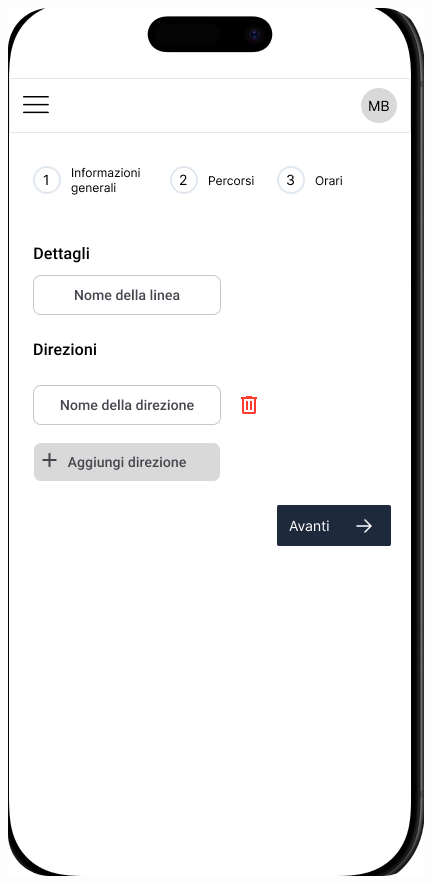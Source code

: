 \begin{figure}[H]
  \centering
  \begin{minipage}[b]{0.25\textwidth}
    \centering
    \includegraphics[width=\textwidth]{images/mockup/Nuova Linea Step 1.png}

\end{minipage}
\end{figure}
